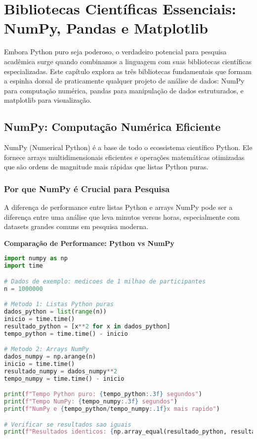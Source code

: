 \chapter{Bibliotecas Científicas Essenciais: NumPy, Pandas e Matplotlib}

Embora Python puro seja poderoso, o verdadeiro potencial para pesquisa acadêmica surge quando combinamos a linguagem com suas bibliotecas científicas especializadas. Este capítulo explora as três bibliotecas fundamentais que formam a espinha dorsal de praticamente qualquer projeto de análise de dados: NumPy para computação numérica, pandas para manipulação de dados estruturados, e matplotlib para visualização.

\section{NumPy: Computação Numérica Eficiente}

NumPy (Numerical Python) é a base de todo o ecossistema científico Python. Ele fornece arrays multidimensionais eficientes e operações matemáticas otimizadas que são ordens de magnitude mais rápidas que listas Python puras.

\subsection{Por que NumPy é Crucial para Pesquisa}

A diferença de performance entre listas Python e arrays NumPy pode ser a diferença entre uma análise que leva minutos versus horas, especialmente com datasets grandes comuns em pesquisa moderna.

\begin{examplebox}
\textbf{Comparação de Performance: Python vs NumPy}

\begin{lstlisting}[language=Python]
import numpy as np
import time

# Dados de exemplo: medicoes de 1 milhao de participantes
n = 1000000

# Metodo 1: Listas Python puras
dados_python = list(range(n))
inicio = time.time()
resultado_python = [x**2 for x in dados_python]
tempo_python = time.time() - inicio

# Metodo 2: Arrays NumPy
dados_numpy = np.arange(n)
inicio = time.time()
resultado_numpy = dados_numpy**2
tempo_numpy = time.time() - inicio

print(f"Tempo Python puro: {tempo_python:.3f} segundos")
print(f"Tempo NumPy: {tempo_numpy:.3f} segundos")
print(f"NumPy e {tempo_python/tempo_numpy:.1f}x mais rapido")

# Verificar se resultados sao iguais
print(f"Resultados identicos: {np.array_equal(resultado_python, resultado_numpy)}")
\end{lstlisting}
\end{examplebox}

